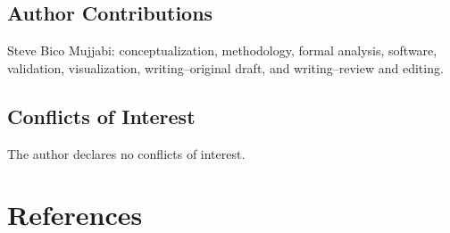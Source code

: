 \documentclass[11pt]{article}
\begin{document}
\subsection*{Author Contributions}
Steve Bico Mujjabi: conceptualization, methodology, formal analysis, software,
validation, visualization, writing--original draft, and writing--review and
editing.

\subsection*{Conflicts of Interest}
The author declares no conflicts of interest.

\section*{References}


\end{document}
